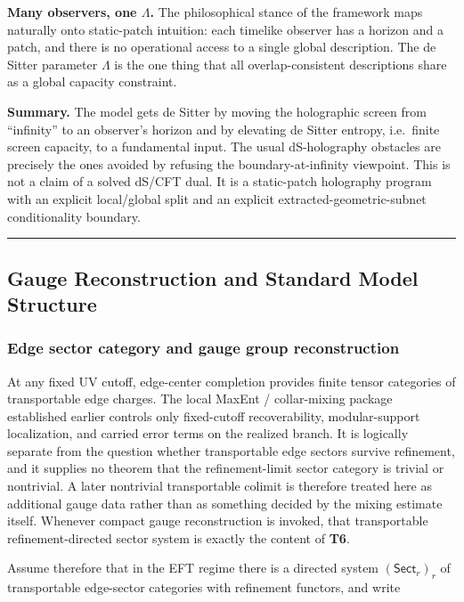 \textbf{Many observers, one \(\Lambda\).} The philosophical stance of the framework maps naturally onto static-patch intuition: each timelike observer has a horizon and a patch, and there is no operational access to a single global description. The de Sitter parameter \(\Lambda\) is the one thing that all overlap-consistent descriptions share as a global capacity constraint.

\textbf{Summary.} The model gets de Sitter by moving the holographic screen from ``infinity'' to an observer's horizon and by elevating de Sitter entropy, i.e.\ finite screen capacity, to a fundamental input. The usual dS-holography obstacles are precisely the ones avoided by refusing the boundary-at-infinity viewpoint. This is not a claim of a solved dS/CFT dual. It is a static-patch holography program with an explicit local/global split and an explicit extracted-geometric-subnet conditionality boundary.

\begin{center}\rule{0.5\linewidth}{0.5pt}\end{center}
\subsection{Gauge Reconstruction and Standard Model Structure}\label{6-gauge-reconstruction-and-standard-model-structure}

\subsubsection{Edge sector category and gauge group reconstruction}\label{61-edge-sector-category-and-gauge-group-reconstruction}

At any fixed UV cutoff, edge-center completion provides finite tensor categories of transportable edge charges. The local MaxEnt / collar-mixing package established earlier controls only fixed-cutoff recoverability, modular-support localization, and carried error terms on the realized branch. It is logically separate from the question whether transportable edge sectors survive refinement, and it supplies no theorem that the refinement-limit sector category is trivial or nontrivial. A later nontrivial transportable colimit is therefore treated here as additional gauge data rather than as something decided by the mixing estimate itself. Whenever compact gauge reconstruction is invoked, that transportable refinement-directed sector system is exactly the content of \textbf{T6}.

Assume therefore that in the EFT regime there is a directed system \((\mathsf{Sect}_r)_r\) of transportable edge-sector categories with refinement functors, and write

